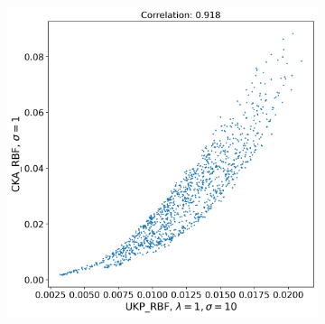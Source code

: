 \documentclass{article}
\theoremstyle{plain}
\begin{document}
\begin{figure}[!h]
\begin{subfigure}[b]{0.45\textwidth}
        \includegraphics[width=\textwidth]{Appendix figures/mnist_experiments/Correlation/Correlation plot for CKA_dist_RBF_1.000000e+00 and UKP_dist_RBF_1.000000e+00_1.000000e+01.png}
    \end{subfigure}
    
    \vspace{0.5cm}  %
    

\end{figure}
\end{document}
